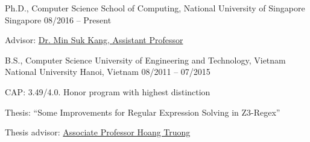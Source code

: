 


\begin{cventries}

  \cventry
    {Ph.D., Computer Science} %
    {School of Computing, National University of Singapore} %
    {Singapore} %
    {08/2016 -- Present} %
    {
      \begin{cvitems} %
        \item {Advisor: \href{http://www.comp.nus.edu.sg/~kangms/}{Dr. Min Suk Kang, Assistant Professor}}
      \end{cvitems}
    }

  \cventry
    {B.S., Computer Science} %
    {University of Engineering and Technology, Vietnam National University} %
    {Hanoi, Vietnam} %
    {08/2011 -- 07/2015} %
    {
      \begin{cvitems} %
        \item {CAP: 3.49/4.0. Honor program with highest distinction}
        \item {Thesis: ``Some Improvements for Regular Expression Solving in Z3-Regex''}
        \item {Thesis advisor: \href{http://www.uet.vnu.edu.vn/~hoangta/}{Associate Professor Hoang Truong}}
      \end{cvitems}
    }


\end{cventries}
